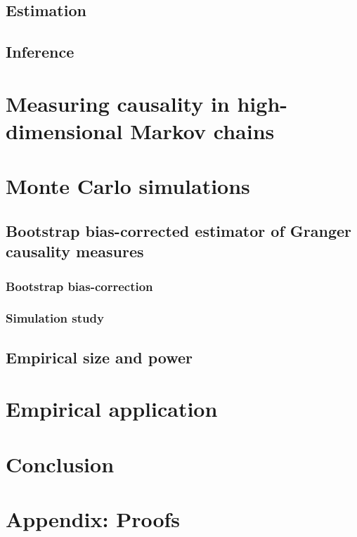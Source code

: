 \documentclass[harvard,11pt]{article}
\begin{document}
\subsection{Estimation \label{Estimation}}

\subsection{Inference \label{Inference}}

\section{Measuring causality in high-dimensional Markov chains \label{Measuring causality in high-dimensional Markov chains}}
\section{Monte Carlo simulations \label{Monte Carlo simulations}}

\subsection{Bootstrap bias-corrected estimator of Granger causality measures \label{Bootstrap bias-corrected estimator of Granger causality measures}}

\subsubsection{Bootstrap bias-correction \label{Bootstrap bias-correction}}

\subsubsection{Simulation study \label{Simulation study}}

\subsection{Empirical size and power \label{Empirical size and power}}

\section{Empirical application\label{Empirical application}}


\section{Conclusion \label{Conclusion}}

\newpage



\newpage

\section{Appendix: Proofs \label{Appendix: Proofs}}
\end{document}
